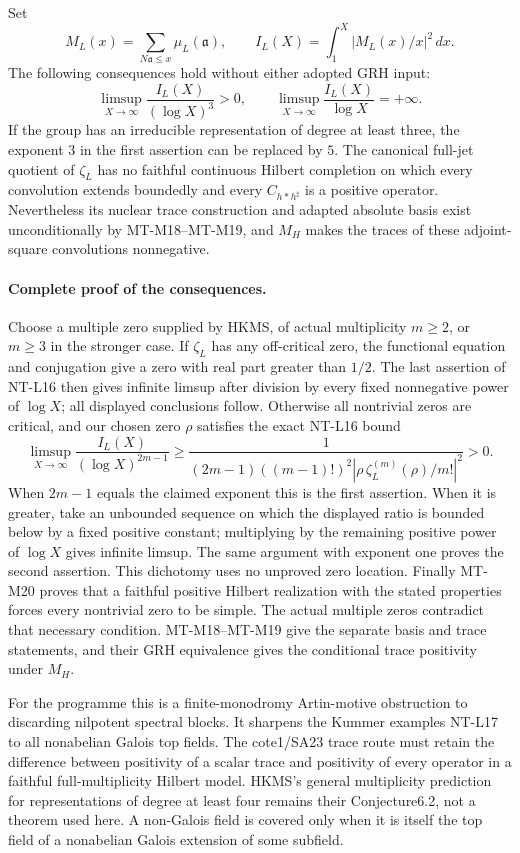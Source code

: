 \documentclass[11pt,a4paper]{article}
\begin{document}
Set
\[
 M_L(x)=\sum_{N\mathfrak a\le x}\mu_L(\mathfrak a),\qquad
 I_L(X)=\int_1^X|M_L(x)/x|^2\,dx.
\]
The following consequences hold without either adopted GRH input:
\[
 \limsup_{X\to\infty}\frac{I_L(X)}{(\log X)^3}>0,
 \qquad
 \limsup_{X\to\infty}\frac{I_L(X)}{\log X}=+\infty.
 \tag{MT-M23a}
\]
If the group has an irreducible representation of degree at least
three, the exponent $3$ in the first assertion can be replaced by
$5$. The canonical full-jet quotient of $\zeta_L$ has no faithful
continuous Hilbert completion on which every convolution extends
boundedly and every $C_{h*h^\sharp}$ is a positive operator.
Nevertheless its nuclear trace construction and adapted absolute
basis exist unconditionally by MT-M18--MT-M19, and $M_H$ makes
the traces of these adjoint-square convolutions nonnegative.

\paragraph{Complete proof of the consequences.}
Choose a multiple zero supplied by HKMS, of actual multiplicity
$m\ge2$, or $m\ge3$ in the stronger case. If $\zeta_L$ has any
off-critical zero, the functional equation and conjugation give
a zero with real part greater than $1/2$. The last assertion of
NT-L16 then gives infinite limsup after division by every fixed
nonnegative power of $\log X$; all displayed conclusions follow.
Otherwise all nontrivial zeros are critical, and our chosen zero
$\rho$ satisfies the exact NT-L16 bound
\[
 \limsup_{X\to\infty}\frac{I_L(X)}{(\log X)^{2m-1}}
 \ge
 \frac{1}{(2m-1)((m-1)!)^2
       |\rho\,\zeta_L^{(m)}(\rho)/m!|^2}>0.
\]
When $2m-1$ equals the claimed exponent this is the first assertion.
When it is greater, take an unbounded sequence on which the
displayed ratio is bounded below by a fixed positive constant;
multiplying by the remaining positive power of $\log X$ gives
infinite limsup. The same argument with exponent one proves
the second assertion. This dichotomy uses no unproved zero
location. Finally MT-M20 proves that a faithful positive Hilbert
realization with the stated properties forces every nontrivial
zero to be simple. The actual multiple zeros contradict that
necessary condition. MT-M18--MT-M19 give the separate basis and
trace statements, and their GRH equivalence gives the conditional
trace positivity under $M_H$.

For the programme this is a finite-monodromy Artin-motive
obstruction to discarding nilpotent spectral blocks. It sharpens
the Kummer examples NT-L17 to all nonabelian Galois top fields.
The cote1/SA23  trace route must retain the
difference between positivity of a scalar trace and positivity
of every operator in a faithful full-multiplicity Hilbert model.
HKMS's general multiplicity prediction for representations of
degree at least four remains their Conjecture6.2, not a theorem
used here. A non-Galois field is covered only when it is itself
the top field of a nonabelian Galois extension of some subfield.
\end{document}
